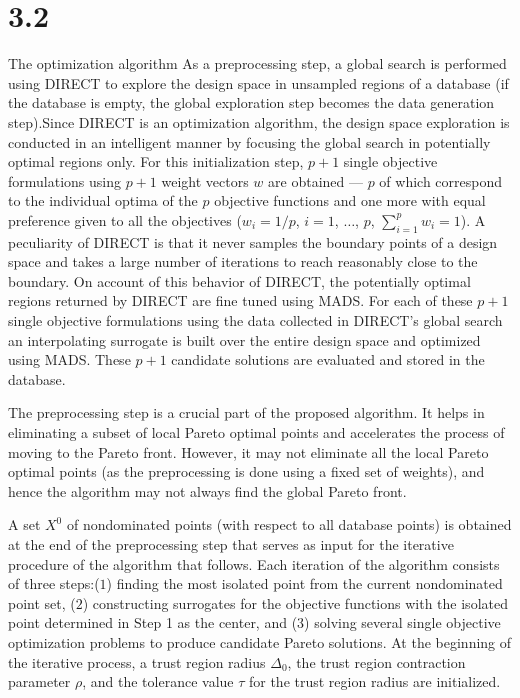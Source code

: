 \section{3.2}{The optimization algorithm} 
As a preprocessing step, a global search is performed using DIRECT to explore
the design space in unsampled regions of a database (if the database is empty,
the global exploration step becomes the data generation step).Since  DIRECT is
an optimization algorithm, the design space exploration is conducted in an
intelligent manner by focusing the global search in potentially optimal regions
only. For this initialization step, $p+1$ single objective formulations using
$p+1$ weight vectors $w$ are obtained --- $p$ of which correspond to the
individual optima of the $p$ objective functions and one more with equal
preference given to all the objectives ($w_i=1/p$, $i=1$, $\ldots$, $p$,
$\sum_{i=1}^{p}w_i=1$).  A peculiarity of DIRECT is that it never samples the
boundary points of a design space and takes a large number of iterations to
reach reasonably close to the boundary. On account of this behavior of DIRECT,
the potentially optimal regions returned by DIRECT are fine tuned using MADS.
For each of these $p+1$ single objective formulations using the data collected
in DIRECT's global search an interpolating surrogate is built over the entire
design space and optimized using MADS. These $p+1$ candidate solutions are
evaluated and stored in the database.

The preprocessing step is a crucial part of the proposed algorithm. It helps in
eliminating a subset of local Pareto optimal points and accelerates the process
of moving to the Pareto front. However, it may not eliminate all the local
Pareto optimal points (as the preprocessing is done using a fixed set of
weights), and hence the algorithm may not always find the global Pareto front.    

A set $X^0$ of nondominated points (with respect to all database points) is
obtained at the end of the preprocessing step that serves as input for the
iterative procedure of the algorithm that follows.  Each iteration of the
algorithm consists of three steps:($1$) finding the most isolated point from
the current nondominated point set, ($2$) constructing surrogates for the
objective functions with the isolated point determined in Step 1 as the center,
and ($3$) solving several single objective optimization problems to produce
candidate Pareto solutions. At the beginning of the iterative process, a  trust
region radius $\Delta_0$, the trust region contraction parameter $\rho$, and
the tolerance value $\tau$ for the trust region radius are initialized.
\smallskip

